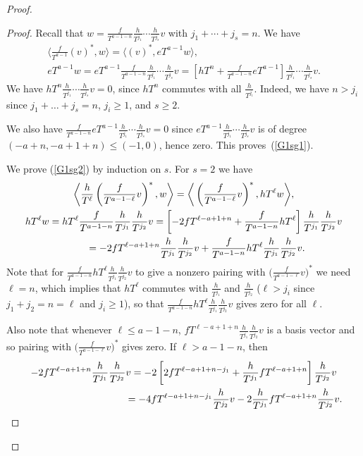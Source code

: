 \documentclass[11pt]{article}
\numberwithin{equation}{section}
\begin{document}
\begin{proof}
\begin{proof}Recall that $w=\frac{f}{T^{a-1-n}}\frac{h}{T^{j_1}} \cdots \frac{h}{T^{j_s}} v$ with $j_1+\cdots+j_s=n$. We have
\begin{gather*}
\bigg\langle \frac{f}{T^{a-1}} (v)^*, w \bigg\rangle = \big\langle (v)^*, eT^{a-1} w \big\rangle, \\
eT^{a-1} w = eT^{a-1} \frac{f}{T^{a-1-n}}\frac{h}{T^{j_1}} \cdots \frac{h}{T^{j_s}} v = \left[ hT^n + \frac{f}{T^{a-1-n}} eT^{a-1} \right] \frac{h}{T^{j_1}} \cdots \frac{h}{T^{j_s}} v.
\end{gather*}
We have $hT^n \frac{h}{T^{j_1}} \cdots \frac{h}{T^{j_s}} v=0$, since $hT^n$ commutes with all $\frac{h}{T^{j_i}}$. Indeed, we have $n > j_i$ since $j_1 + \dots + j_s = n$, $j_i \geq 1$, and $s \geq 2$.

We also have $\frac{f}{T^{a-1-n}} eT^{a-1} \frac{h}{T^{j_1}} \cdots \frac{h}{T^{j_s}} v=0$ since $eT^{a-1} \frac{h}{T^{j_1}} \cdots \frac{h}{T^{j_s}}v$ is of degree $(-a+n, -a+1+n) \leq (-1, 0)$, hence zero. This proves~(\ref{G1sg1}).

We prove (\ref{G1sg2}) by induction on $s$. For $s=2$ we have
\begin{gather*}
\bigg\langle \frac{h}{T^{\ell}} \left(\frac{f}{T^{a-1-\ell}}v\right)^*, w \bigg\rangle = \bigg\langle \left(\frac{f}{T^{a-1-\ell}}v\right)^*, hT^{\ell} w \bigg\rangle, \\
hT^{\ell} w = hT^{\ell} \frac{f}{T^{a-1-n}}\frac{h}{T^{j_1}} \frac{h}{T^{j_2}} v = \left[ -2 fT^{\ell-a+1+n} + \frac{f}{T^{a-1-n}} hT^{\ell} \right] \frac{h}{T^{j_1}} \frac{h}{T^{j_2}} v \\
\hphantom{hT^{\ell} w}{} = -2 fT^{\ell-a+1+n} \frac{h}{T^{j_1}} \frac{h}{T^{j_2}} v + \frac{f}{T^{a-1-n}} hT^{\ell} \frac{h}{T^{j_1}} \frac{h}{T^{j_2}} v.
\end{gather*}
Note that for $ \frac{f}{T^{a-1-n}} hT^{\ell} \frac{h}{T^{j_1}} \frac{h}{T^{j_2}} v $ to give a nonzero pairing with $\big(\frac{f}{T^{a-1-\ell}}v\big)^*$ we need $\ell=n$, which implies that $hT^{\ell}$ commutes with $\frac{h}{T^{j_1}}$ and $\frac{h}{T^{j_2}}$ ($\ell > j_i$ since $j_1+j_2 =n=\ell$ and $j_i \geq 1$), so that $ \frac{f}{T^{a-1-n}} hT^{\ell} \frac{h}{T^{j_1}} \frac{h}{T^{j_2}} v $ gives zero for all $\ell$.

Also note that whenever $\ell \leq a-1-n$, $fT^{\ell-a+1+n} \frac{h}{T^{j_1}} \frac{h}{T^{j_2}} v$ is a basis vector and so pairing with $\big(\frac{f}{T^{a-1-\ell}}v\big)^*$ gives zero. If $\ell > a-1-n$, then
\begin{gather}
-2 fT^{\ell-a+1+n} \frac{h}{T^{j_1}} \frac{h}{T^{j_2}} v = -2 \left[ 2 fT^{\ell-a+1+n-j_1} + \frac{h}{T^{j_1}} fT^{\ell-a+1+n} \right] \frac{h}{T^{j_2}} v \nonumber \\
\hphantom{-2 fT^{\ell-a+1+n} \frac{h}{T^{j_1}} \frac{h}{T^{j_2}} v}{} = -4 fT^{\ell-a+1+n-j_1} \frac{h}{T^{j_2}} v -2 \frac{h}{T^{j_1}} fT^{\ell-a+1+n} \frac{h}{T^{j_2}} v. \label{1 and 2}
\end{gather}


\end{proof}
\end{proof}
\end{document}
